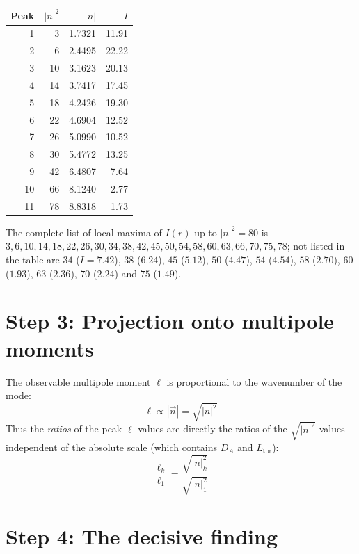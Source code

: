 \begin{center}
\begin{tabular}{rrrr}
\toprule
Peak & $|n|^2$ & $|n|$ & $I$ \\
\midrule
1 & 3  & 1{.}7321 & 11{.}91 \\
2 & 6  & 2{.}4495 & 22{.}22 \\
3 & 10 & 3{.}1623 & 20{.}13 \\
4 & 14 & 3{.}7417 & 17{.}45 \\
5 & 18 & 4{.}2426 & 19{.}30 \\
6 & 22 & 4{.}6904 & 12{.}52 \\
7 & 26 & 5{.}0990 & 10{.}52 \\
8 & 30 & 5{.}4772 & 13{.}25 \\
9 & 42 & 6{.}4807 & 7{.}64  \\
10 & 66 & 8{.}1240 & 2{.}77 \\
11 & 78 & 8{.}8318 & 1{.}73 \\
\bottomrule
\end{tabular}
\end{center}
The complete list of local maxima of $I(r)$ up to $|n|^2=80$ is
$3, 6, 10, 14, 18, 22, 26, 30, 34, 38, 42, 45, 50, 54, 58, 60, 63, 66, 70, 75, 78$;
not listed in the table are $34$ ($I=7.42$), $38$ ($6.24$), $45$ ($5.12$),
$50$ ($4.47$), $54$ ($4.54$), $58$ ($2.70$), $60$ ($1.93$), $63$ ($2.36$),
$70$ ($2.24$) and $75$ ($1.49$).

\section{Step 3: Projection onto multipole moments}

The observable multipole moment $\ell$ is proportional to the
wavenumber of the mode:
\[
  \ell \propto |\vec{n}| = \sqrt{|n|^2}
\]
Thus the \emph{ratios} of the peak $\ell$ values are directly the
ratios of the $\sqrt{|n|^2}$ values -- independent of the absolute
scale (which contains $D_A$ and $L_\mathrm{tor}$):
\[
  \frac{\ell_k}{\ell_1} = \frac{\sqrt{|n|^2_k}}{\sqrt{|n|^2_1}}
\]

\section{Step 4: The decisive finding}


